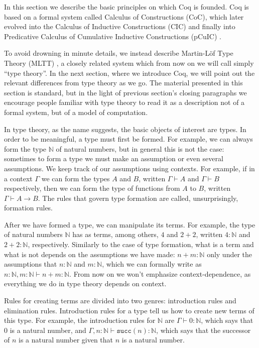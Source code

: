\documentclass[declaration,mgr,english,shortabstract]{iithesis}
\newcommand{\m}[1]{\texttt{#1}}
\newcommand{\type}[2]{#1 \vdash #2}
\newcommand{\term}[3]{#1 \vdash #2 : #3}
\newcommand{\N}{\mathbb{N}}
\newcommand{\suc}[1]{\m{succ}(#1)}
\begin{document}
In this section we describe the basic principles on which Coq is founded. Coq is based on a formal system called Calculus of Constructions (CoC)\cite{CoC}, which later evolved into the Calculus of Inductive Constructions (CIC) \cite{CIC} and finally into Predicative Calculus of Cumulative Inductive Constructions (pCuIC) \cite{pCuIC}.

To avoid drowning in minute details, we instead describe Martin-L\"{o}f Type Theory (MLTT) \cite{MLTT1} \cite{MLTT2}, a closely related system which from now on we will call simply ``type theory''. In the next section, where we introduce Coq, we will point out the relevant differences from type theory as we go. The material presented in this section is standard, but in the light of previous section's closing paragraphs we encourage people familiar with type theory to read it as a description not of a formal system, but of a model of computation.

In type theory, as the name suggests, the basic objects of interest are types. In order to be meaningful, a type must first be formed. For example, we can always form the type $\N$ of natural numbers, but in general this is not the case: sometimes to form a type we must make an assumption or even several assumptions. We keep track of our assumptions using contexts. For example, if in a context $\Gamma$ we can form the types $A$ and $B$, written $\type{\Gamma}{A}$ and $\type{\Gamma}{B}$ respectively, then we can form the type of functions from $A$ to $B$, written $\type{\Gamma}{A \to B}$. The rules that govern type formation are called, unsurprisingly, formation rules.

After we have formed a type, we can manipulate its terms. For example, the type of natural numbers $\N$ has as terms, among others, $4$ and $2 + 2$, written $4 : \N$ and $2 + 2 : \N$, respectively. Similarly to the case of type formation, what is a term and what is not depends on the assumptions we have made: $n + m : \N$ only under the assumptions that $n : \N$ and $m : \N$, which we can formally write as $\term{n : \N, m : \N}{n + m}{\N}$. From now on we won't emphasize context-dependence, as everything we do in type theory depends on context.

Rules for creating terms are divided into two genres: introduction rules and elimination rules. Introduction rules for a type tell us how to create new terms of this type. For example, the introduction rules for $\N$ are $\term{\Gamma}{0}{\N}$, which says that $0$ is a natural number, and $\term{\Gamma, n : \N}{\suc{n}}{\N}$, which says that the successor of $n$ is a natural number given that $n$ is a natural number.
\end{document}

